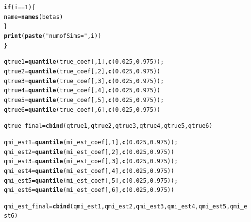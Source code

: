 \documentclass[fleqn,10pt]{wlscirep}\usepackage[]{graphicx}\usepackage[]{color}
\makeatletter
\newcommand{\hlnum}[1]{\textcolor[rgb]{0.686,0.059,0.569}{#1}}%
\newcommand{\hlstr}[1]{\textcolor[rgb]{0.192,0.494,0.8}{#1}}%
\newcommand{\hlopt}[1]{\textcolor[rgb]{0,0,0}{#1}}%
\newcommand{\hlstd}[1]{\textcolor[rgb]{0.345,0.345,0.345}{#1}}%
\newcommand{\hlkwa}[1]{\textcolor[rgb]{0.161,0.373,0.58}{\textbf{#1}}}%
\newcommand{\hlkwb}[1]{\textcolor[rgb]{0.69,0.353,0.396}{#1}}%
\newcommand{\hlkwd}[1]{\textcolor[rgb]{0.737,0.353,0.396}{\textbf{#1}}}%
\newenvironment{kframe}{%
 \def\at@end@of@kframe{}%
 \ifinner\ifhmode%
  \def\at@end@of@kframe{\end{minipage}}%
  \begin{minipage}{\columnwidth}%
 \fi\fi%
 \def\FrameCommand##1{\hskip\@totalleftmargin \hskip-\fboxsep
 \colorbox{shadecolor}{##1}\hskip-\fboxsep
     \hskip-\linewidth \hskip-\@totalleftmargin \hskip\columnwidth}%
 \MakeFramed {\advance\hsize-\width
   \@totalleftmargin\z@ \linewidth\hsize
   \@setminipage}}%
 {\par\unskip\endMakeFramed%
 \at@end@of@kframe}
\newenvironment{knitrout}{}{} %
\makeatother
\begin{document}
\begin{knitrout}
\begin{kframe}
\begin{alltt}
    \hlkwa{if} \hlstd{(i}\hlopt{==}\hlnum{1}\hlstd{)\{}
      \hlstd{name} \hlkwb{=} \hlkwd{names}\hlstd{(betas)}
    \hlstd{\}}
    \hlkwd{print}\hlstd{(}\hlkwd{paste}\hlstd{(}\hlstr{"num of Sims = "}\hlstd{, i))}
  \hlstd{\}}

  \hlstd{qtrue1} \hlkwb{=} \hlkwd{quantile}\hlstd{(true_coef[,}\hlnum{1}\hlstd{],} \hlkwd{c}\hlstd{(}\hlnum{0.025}\hlstd{,} \hlnum{0.975}\hlstd{));}
  \hlstd{qtrue2} \hlkwb{=} \hlkwd{quantile}\hlstd{(true_coef[,}\hlnum{2}\hlstd{],} \hlkwd{c}\hlstd{(}\hlnum{0.025}\hlstd{,} \hlnum{0.975}\hlstd{))}
  \hlstd{qtrue3} \hlkwb{=} \hlkwd{quantile}\hlstd{(true_coef[,}\hlnum{3}\hlstd{],} \hlkwd{c}\hlstd{(}\hlnum{0.025}\hlstd{,} \hlnum{0.975}\hlstd{));}
  \hlstd{qtrue4} \hlkwb{=} \hlkwd{quantile}\hlstd{(true_coef[,}\hlnum{4}\hlstd{],} \hlkwd{c}\hlstd{(}\hlnum{0.025}\hlstd{,} \hlnum{0.975}\hlstd{))}
  \hlstd{qtrue5} \hlkwb{=} \hlkwd{quantile}\hlstd{(true_coef[,}\hlnum{5}\hlstd{],} \hlkwd{c}\hlstd{(}\hlnum{0.025}\hlstd{,} \hlnum{0.975}\hlstd{));}
  \hlstd{qtrue6} \hlkwb{=} \hlkwd{quantile}\hlstd{(true_coef[,}\hlnum{6}\hlstd{],} \hlkwd{c}\hlstd{(}\hlnum{0.025}\hlstd{,} \hlnum{0.975}\hlstd{))}

  \hlstd{qtrue_final} \hlkwb{=} \hlkwd{cbind}\hlstd{(qtrue1, qtrue2, qtrue3, qtrue4, qtrue5, qtrue6)}

  \hlstd{qmi_est1} \hlkwb{=} \hlkwd{quantile}\hlstd{(mi_est_coef[,}\hlnum{1}\hlstd{],} \hlkwd{c}\hlstd{(}\hlnum{0.025}\hlstd{,} \hlnum{0.975}\hlstd{));}
  \hlstd{qmi_est2} \hlkwb{=} \hlkwd{quantile}\hlstd{(mi_est_coef[,}\hlnum{2}\hlstd{],} \hlkwd{c}\hlstd{(}\hlnum{0.025}\hlstd{,} \hlnum{0.975}\hlstd{))}
  \hlstd{qmi_est3} \hlkwb{=} \hlkwd{quantile}\hlstd{(mi_est_coef[,}\hlnum{3}\hlstd{],} \hlkwd{c}\hlstd{(}\hlnum{0.025}\hlstd{,} \hlnum{0.975}\hlstd{));}
  \hlstd{qmi_est4} \hlkwb{=} \hlkwd{quantile}\hlstd{(mi_est_coef[,}\hlnum{4}\hlstd{],} \hlkwd{c}\hlstd{(}\hlnum{0.025}\hlstd{,} \hlnum{0.975}\hlstd{))}
  \hlstd{qmi_est5} \hlkwb{=} \hlkwd{quantile}\hlstd{(mi_est_coef[,}\hlnum{5}\hlstd{],} \hlkwd{c}\hlstd{(}\hlnum{0.025}\hlstd{,} \hlnum{0.975}\hlstd{));}
  \hlstd{qmi_est6} \hlkwb{=} \hlkwd{quantile}\hlstd{(mi_est_coef[,}\hlnum{6}\hlstd{],} \hlkwd{c}\hlstd{(}\hlnum{0.025}\hlstd{,} \hlnum{0.975}\hlstd{))}

  \hlstd{qmi_est_final} \hlkwb{=} \hlkwd{cbind}\hlstd{(qmi_est1, qmi_est2, qmi_est3, qmi_est4, qmi_est5, qmi_est6)}


\end{alltt}
\end{kframe}
\end{knitrout}
\end{document}
